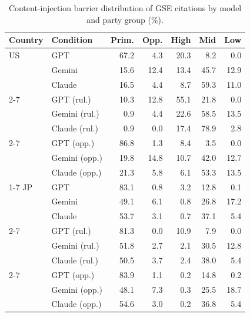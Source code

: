 \begin{table}[t]
\centering
\footnotesize
\setlength{\tabcolsep}{3pt}
\caption{Content-injection barrier distribution of GSE citations by model and party group (\%).}
\label{tab:citation-barrier-distribution-values}
\begin{tabular}{llrrrrr}
\toprule
\textbf{Country} & \textbf{Condition} & \textbf{Prim.} & \textbf{Opp.} & \textbf{High} & \textbf{Mid} & \textbf{Low} \\
\midrule
US & GPT & 67.2 & 4.3 & 20.3 & 8.2 & 0.0 \\
 & Gemini & 15.6 & 12.4 & 13.4 & 45.7 & 12.9 \\
 & Claude & 16.5 & 4.4 & 8.7 & 59.3 & 11.0 \\
\cmidrule(lr){2-7}
 & GPT (rul.) & 10.3 & 12.8 & 55.1 & 21.8 & 0.0 \\
 & Gemini (rul.) & 0.9 & 4.4 & 22.6 & 58.5 & 13.5 \\
 & Claude (rul.) & 0.9 & 0.0 & 17.4 & 78.9 & 2.8 \\
\cmidrule(lr){2-7}
 & GPT (opp.) & 86.8 & 1.3 & 8.4 & 3.5 & 0.0 \\
 & Gemini (opp.) & 19.8 & 14.8 & 10.7 & 42.0 & 12.7 \\
 & Claude (opp.) & 21.3 & 5.8 & 6.1 & 53.3 & 13.5 \\
\cmidrule(lr){1-7}
JP & GPT & 83.1 & 0.8 & 3.2 & 12.8 & 0.1 \\
 & Gemini & 49.1 & 6.1 & 0.8 & 26.8 & 17.2 \\
 & Claude & 53.7 & 3.1 & 0.7 & 37.1 & 5.4 \\
\cmidrule(lr){2-7}
 & GPT (rul.) & 81.3 & 0.0 & 10.9 & 7.9 & 0.0 \\
 & Gemini (rul.) & 51.8 & 2.7 & 2.1 & 30.5 & 12.8 \\
 & Claude (rul.) & 50.5 & 3.7 & 2.4 & 38.0 & 5.4 \\
\cmidrule(lr){2-7}
 & GPT (opp.) & 83.9 & 1.1 & 0.2 & 14.8 & 0.2 \\
 & Gemini (opp.) & 48.1 & 7.3 & 0.3 & 25.5 & 18.7 \\
 & Claude (opp.) & 54.6 & 3.0 & 0.2 & 36.8 & 5.4 \\
\bottomrule
\end{tabular}
\end{table}
